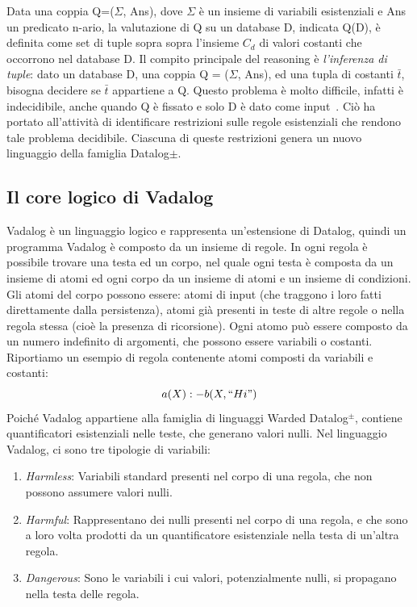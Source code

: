 Data una coppia Q=($\Sigma$, Ans), dove $\Sigma$ è un insieme di variabili esistenziali e Ans un predicato n-ario, la valutazione di Q su un database D, indicata Q(D), è definita come set di tuple sopra sopra l'insieme $C_{d}$ di valori costanti che occorrono nel database D. \newline
Il compito principale del reasoning è \emph{l'inferenza di tuple}: dato un database D, una coppia Q = ($\Sigma$, Ans), ed una tupla di costanti $\bar{t}$, bisogna decidere se $\bar{t}$ appartiene a Q. Questo problema è molto difficile, infatti è indecidibile, anche quando Q è fissato e solo D è dato come input~\cite{cali2013taming}. \newline
Ciò ha portato all'attività di identificare restrizioni sulle regole esistenziali che rendono tale problema decidibile. Ciascuna di queste restrizioni genera un nuovo linguaggio della famiglia Datalog$\pm$. \newline

\subsection{Il core logico di Vadalog}

Vadalog è un linguaggio logico e rappresenta un'estensione di Datalog, quindi un programma Vadalog è composto da un insieme di regole. \newline
In ogni regola è possibile trovare una testa ed un corpo, nel quale ogni testa è composta da un insieme di atomi ed ogni corpo da un insieme di atomi e un insieme di condizioni. Gli atomi del corpo possono essere: atomi di input (che traggono i loro fatti direttamente dalla persistenza), atomi già presenti in teste di altre regole o nella regola stessa (cioè la presenza di ricorsione). \newline 
Ogni atomo può essere composto da un numero indefinito di argomenti, che possono essere variabili o costanti. \newline
Riportiamo un esempio di regola contenente atomi composti da variabili e costanti: \[a(X) :- b(X,``Hi")\]
Poiché Vadalog appartiene alla famiglia di linguaggi Warded Datalog$^\pm$, contiene quantificatori esistenziali nelle teste, che generano valori nulli. \newline
Nel linguaggio Vadalog, ci sono tre tipologie di variabili:

\begin{enumerate}
	\item \emph{Harmless}: Variabili standard presenti nel corpo di una regola, che non possono assumere valori nulli.
	\item \emph{Harmful}: Rappresentano dei nulli presenti nel corpo di una regola, e che sono a loro volta prodotti da un quantificatore esistenziale nella testa di un'altra regola.
	\item \emph{Dangerous}: Sono le variabili i cui valori, potenzialmente nulli, si propagano nella testa delle regola.
\end{enumerate}

